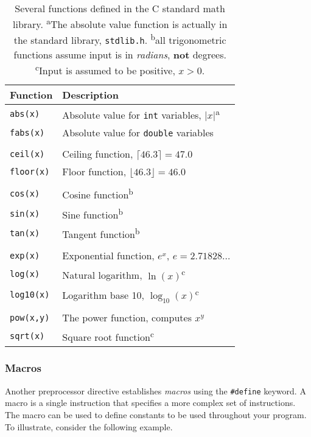 \begin{table}
\centering
\begin{tabular}{l|l}
\hline
Function & Description \\
\hline
\texttt{abs(x)}  & Absolute value for \texttt{int} variables, $|x|$\textsuperscript{a}\\
\texttt{fabs(x)} & Absolute value for \texttt{double} variables \\
\\
\texttt{ceil(x)} & Ceiling function, $\lceil 46.3\rceil = 47.0$\\
\texttt{floor(x)} & Floor function, $\lfloor 46.3 \rfloor =46.0$\\
\\
\texttt{cos(x)} & Cosine function\textsuperscript{b}\\
\texttt{sin(x)} & Sine function\textsuperscript{b}\\
\texttt{tan(x)} & Tangent function\textsuperscript{b}\\
\\
\texttt{exp(x)} & Exponential function, $e^x$, $e = 2.71828\ldots$ \\
\texttt{log(x)}  & Natural logarithm, $\ln{(x)}$\textsuperscript{c} \\
\texttt{log10(x)} & Logarithm base 10, $\log_{10}{(x)}$\textsuperscript{c} \\
\\
\texttt{pow(x,y)} & The power function, computes $x^y$\\
\texttt{sqrt(x)} & Square root function\textsuperscript{c}\\

\hline
\end{tabular}
\caption[Several functions defined in the C standard math library]{Several functions defined in the C standard math library.  \textsuperscript{a}The absolute value function is actually in the standard library, \texttt{stdlib.h}.  \textsuperscript{b}all trigonometric functions assume input is in \emph{radians}, \textbf{not} degrees. \textsuperscript{c}Input is assumed to be positive, $x > 0$.}
\label{table:cMathFunctions}
\end{table}

\subsubsection{Macros}

Another preprocessor directive establishes \emph{macros} using the \texttt{#define}
keyword.  A macro is a single instruction that specifies a more complex set of instructions.
The macro can be used to define constants to be used throughout your program.  To 
illustrate, consider the following example.

